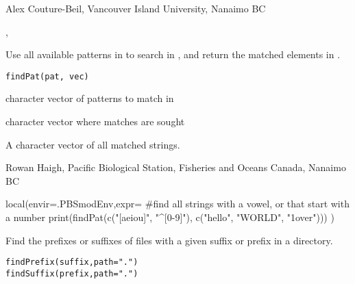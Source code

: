 \documentclass[letterpaper]{book}
\begin{document}
%
\begin{Author}\relax
Alex Couture-Beil, Vancouver Island University, Nanaimo BC
\end{Author}
%
\begin{SeeAlso}\relax
{}, 
\end{SeeAlso}
%
\begin{Description}\relax
Use all available patterns in  to search in , 
and return the matched elements in .
\end{Description}
%
\begin{Usage}
\begin{verbatim}
findPat(pat, vec)
\end{verbatim}
\end{Usage}
%
\begin{Arguments}
\begin{ldescription}
\item[\code{pat}] character vector of patterns to match in 
\item[\code{vec}] character vector where matches are sought
\end{ldescription}
\end{Arguments}
%
\begin{Value}
A character vector of all matched strings.
\end{Value}
%
\begin{Author}\relax
Rowan Haigh, Pacific Biological Station, Fisheries and Oceans Canada, Nanaimo BC
\end{Author}
%
\begin{Examples}
\begin{ExampleCode}
local(envir=.PBSmodEnv,expr={
  #find all strings with a vowel, or that start with a number
  print(findPat(c("[aeiou]", "^[0-9]"), c("hello", "WORLD", "1over")))
})
\end{ExampleCode}
\end{Examples}
%
\begin{Description}\relax
Find the prefixes or suffixes of files with a given suffix or prefix in a directory.
\end{Description}
%
\begin{Usage}
\begin{verbatim}
findPrefix(suffix,path=".")
findSuffix(prefix,path=".")
\end{verbatim}
\end{Usage}
\end{document}
